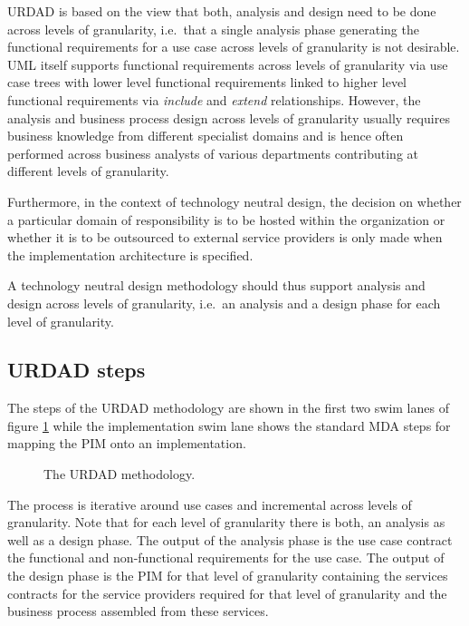 \documentclass[reviewcopy]{elsart}
\begin{document}
URDAD is based on the view that both, analysis and design need to be done
across levels of granularity, i.e.\ that a single analysis phase generating
the functional requirements for a use case across levels of granularity
is not desirable. UML itself supports functional requirements across
levels of granularity via use case trees
with lower level functional requirements linked to higher level functional
requirements via {\em include} and {\em extend} relationships.
However, the analysis
and business process design across levels of granularity usually requires
business knowledge from different specialist domains and is hence often
performed across business analysts of various departments
contributing at different levels of granularity.

Furthermore, in the context of technology neutral design, the decision on
whether a particular domain of responsibility is to be hosted within the
organization or whether it is to be outsourced to external service providers is
only made when the implementation architecture is specified.

A technology neutral design methodology should thus support analysis and design
across levels of granularity, i.e.\ an analysis and a design phase for each
level of granularity.



\subsection{URDAD steps}

The steps of the URDAD methodology are shown in the first two swim lanes of
figure \ref{fig:methodology} while the implementation swim lane shows the
standard MDA steps for mapping the PIM onto an implementation.

\begin{figure}
  \centering
  \caption{The URDAD methodology.}
  \label{fig:methodology}
\end{figure}

The process is iterative around use cases and incremental across levels of
granularity. Note that for each level of granularity there is both, an analysis
as well as a design phase. The output of the analysis phase is the use
case contract the functional and non-functional requirements for the use
case. The output of the design phase is the PIM for that level of
granularity containing the services contracts for the service providers
required for that level of granularity and the business process assembled
from these services.
\end{document}

